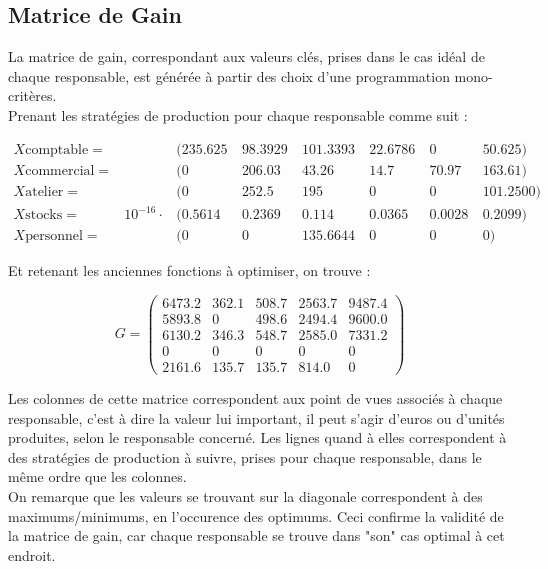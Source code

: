 \subsection{Matrice de Gain}

La matrice de gain, correspondant aux valeurs clés, prises dans le cas
idéal de chaque responsable, est générée à partir des choix d'une
programmation mono-critères. \\

Prenant les stratégies de production pour chaque responsable comme suit :

$$
\begin{array}{rllllllll}
    X\mbox{comptable} =  & & (235.625&~ 98.3929&~ 101.3393&~ 22.6786&~ 0&~ 50.625) \\
    X\mbox{commercial} = & & (0&~ 206.03&~ 43.26&~ 14.7&~ 70.97&~ 163.61) \\
    X\mbox{atelier} =    & & (0&~ 252.5&~ 195&~ 0&~ 0&~ 101.2500) \\
    X\mbox{stocks} =     & 10^{-16} \cdot &(0.5614&~ 0.2369&~ 0.114&~ 0.0365&~ 0.0028&~ 0.2099) \\
    X\mbox{personnel} =  & & (0&~ 0&~ 135.6644&~ 0&~ 0&~ 0)
\end{array}
$$

Et retenant les anciennes fonctions à optimiser, on trouve :

$$
G =
\left (
    \begin{array}{ccccc}
        6473.2 & 362.1 & 508.7 & 2563.7 & 9487.4 \\
        5893.8 &     0 & 498.6 & 2494.4 & 9600.0 \\
        6130.2 & 346.3 & 548.7 & 2585.0 & 7331.2 \\
        0 &     0 &     0 &      0 &      0 \\
        2161.6 & 135.7 & 135.7 &  814.0 &      0
    \end{array}
\right )
$$

Les colonnes de cette matrice correspondent aux point de vues associés à chaque
responsable, c'est à dire la valeur lui important, il peut s'agir d'euros ou
d'unités produites, selon le responsable concerné. Les lignes quand à elles
correspondent à des stratégies de production à suivre, prises pour chaque
responsable, dans le même ordre que les colonnes. \\

On remarque que les valeurs se trouvant sur la diagonale correspondent à des
maximums/minimums, en l'occurence des optimums. Ceci confirme la validité de
la matrice de gain, car chaque responsable se trouve dans "son" cas optimal
à cet endroit.

